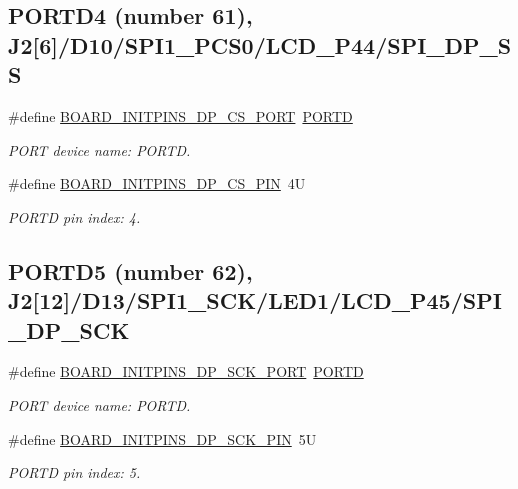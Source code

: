 \subsection*{P\+O\+R\+T\+D4 (number 61), J2\mbox{[}6\mbox{]}/\+D10/\+S\+P\+I1\+\_\+\+P\+C\+S0/\+L\+C\+D\+\_\+\+P44/\+S\+P\+I\+\_\+\+D\+P\+\_\+\+SS}
\begin{DoxyCompactItemize}
\item 
\mbox{\label{group__pin__mux_ga2544cbc6d133f2f24db8168ba3ce5401}} 
\#define \mbox{\hyperlink{group__pin__mux_ga2544cbc6d133f2f24db8168ba3ce5401}{B\+O\+A\+R\+D\+\_\+\+I\+N\+I\+T\+P\+I\+N\+S\+\_\+\+D\+P\+\_\+\+C\+S\+\_\+\+P\+O\+RT}}~\mbox{\hyperlink{group___p_o_r_t___peripheral___access___layer_ga3e6a2517db4f9cb7c9037adf0aefe79b}{P\+O\+R\+TD}}
\begin{DoxyCompactList}\small\item\em P\+O\+RT device name\+: P\+O\+R\+TD. \end{DoxyCompactList}\item 
\mbox{\label{group__pin__mux_gaf84c55b422f777b356707af2614ac288}} 
\#define \mbox{\hyperlink{group__pin__mux_gaf84c55b422f777b356707af2614ac288}{B\+O\+A\+R\+D\+\_\+\+I\+N\+I\+T\+P\+I\+N\+S\+\_\+\+D\+P\+\_\+\+C\+S\+\_\+\+P\+IN}}~4U
\begin{DoxyCompactList}\small\item\em P\+O\+R\+TD pin index\+: 4. \end{DoxyCompactList}\end{DoxyCompactItemize}
\subsection*{P\+O\+R\+T\+D5 (number 62), J2\mbox{[}12\mbox{]}/\+D13/\+S\+P\+I1\+\_\+\+S\+C\+K/\+L\+E\+D1/\+L\+C\+D\+\_\+\+P45/\+S\+P\+I\+\_\+\+D\+P\+\_\+\+S\+CK}
\begin{DoxyCompactItemize}
\item 
\mbox{\label{group__pin__mux_ga88f583168ae70cf3105edcd5dda5bee8}} 
\#define \mbox{\hyperlink{group__pin__mux_ga88f583168ae70cf3105edcd5dda5bee8}{B\+O\+A\+R\+D\+\_\+\+I\+N\+I\+T\+P\+I\+N\+S\+\_\+\+D\+P\+\_\+\+S\+C\+K\+\_\+\+P\+O\+RT}}~\mbox{\hyperlink{group___p_o_r_t___peripheral___access___layer_ga3e6a2517db4f9cb7c9037adf0aefe79b}{P\+O\+R\+TD}}
\begin{DoxyCompactList}\small\item\em P\+O\+RT device name\+: P\+O\+R\+TD. \end{DoxyCompactList}\item 
\mbox{\label{group__pin__mux_ga2ceee395df073b21a6c72fad76bad118}} 
\#define \mbox{\hyperlink{group__pin__mux_ga2ceee395df073b21a6c72fad76bad118}{B\+O\+A\+R\+D\+\_\+\+I\+N\+I\+T\+P\+I\+N\+S\+\_\+\+D\+P\+\_\+\+S\+C\+K\+\_\+\+P\+IN}}~5U
\begin{DoxyCompactList}\small\item\em P\+O\+R\+TD pin index\+: 5. \end{DoxyCompactList}\end{DoxyCompactItemize}
